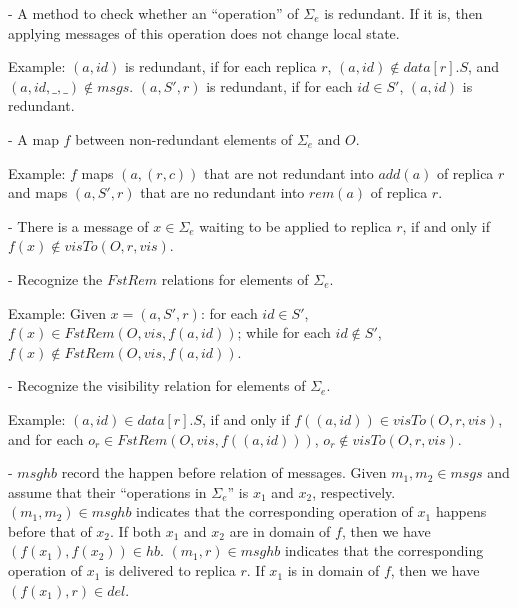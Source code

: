 \noindent - A method to check whether an ``operation'' of $\Sigma_e$ is redundant. If it is, then applying messages of this operation does not change local state.

Example: $(a,\mathit{id})$ is redundant, if for each replica $r$, $(a,\mathit{id}) \notin \mathit{data}[r].S$, and $(a,\mathit{id},\_,\_) \notin \mathit{msgs}$. $(a,S',r)$ is redundant, if for each $\mathit{id} \in S'$, $(a,\mathit{id})$ is redundant.

\noindent - A map $f$ between non-redundant elements of $\Sigma_e$ and $O$.%

Example: $f$ maps $(a,(r,c))$ that are not redundant into $\mathit{add}(a)$ of replica $r$ and maps $(a,S',r)$ that are no redundant into $\mathit{rem}(a)$ of replica $r$.


\noindent - There is a message of $x \in \Sigma_e$ waiting to be applied to replica $r$, if and only if $f(x) \notin \mathit{visTo}(O,r,\mathit{vis})$.

\noindent - Recognize the $\mathit{FstRem}$ relations for elements of $\Sigma_e$.

Example: Given $x=(a,S',r)$: for each $\mathit{id} \in S'$, $f(x) \in \mathit{FstRem}(O,\mathit{vis},f(a,\mathit{id}))$; while for each $\mathit{id} \notin S'$, $f(x) \notin \mathit{FstRem}(O,\mathit{vis},f(a,\mathit{id}))$.

\noindent - Recognize the visibility relation for elements of $\Sigma_e$.

Example: $(a,\mathit{id}) \in data[r].S$, if and only if $f((a,\mathit{id})) \in \mathit{visTo}(O,r,\mathit{vis})$, and for each $o_r \in \mathit{FstRem}(O,\mathit{vis},f((a,\mathit{id})))$, $o_r \notin \mathit{visTo}(O,r,\mathit{vis})$.

\noindent - $\mathit{msghb}$ record the happen before relation of messages. Given $m_1,m_2 \in \mathit{msgs}$ and assume that their ``operations in $\Sigma_e$'' is $x_1$ and $x_2$, respectively. $(m_1,m_2) \in \mathit{msghb}$ indicates that the corresponding operation of $x_1$ happens before that of $x_2$. If both $x_1$ and $x_2$ are in domain of $f$, then we have $(f(x_1),f(x_2)) \in \mathit{hb}$. $(m_1,r) \in \mathit{msghb}$ indicates that the corresponding operation of $x_1$ is delivered to replica $r$. If $x_1$ is in domain of $f$, then we have $(f(x_1),r) \in \mathit{del}$.




